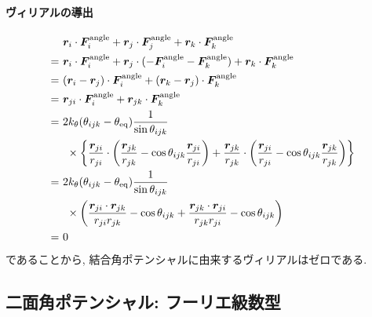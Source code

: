 \paragraph{ヴィリアルの導出}
\begin{align}
 &~  \bm{r}_{i} \cdot \bm{F}_{i}^{\mathrm{angle}}
   + \bm{r}_{j} \cdot \bm{F}_{j}^{\mathrm{angle}}
   + \bm{r}_{k} \cdot \bm{F}_{k}^{\mathrm{angle}}
 \notag \\
 =&~
     \bm{r}_{i} \cdot \bm{F}_{i}^{\mathrm{angle}}
   + \bm{r}_{j} \cdot (-\bm{F}_{i}^{\mathrm{angle}} -\bm{F}_{k}^{\mathrm{angle}})
   + \bm{r}_{k} \cdot \bm{F}_{k}^{\mathrm{angle}}
 \notag \\
 =&~
     (\bm{r}_{i} - \bm{r}_{j}) \cdot \bm{F}_{i}^{\mathrm{angle}}
   + (\bm{r}_{k} - \bm{r}_{j}) \cdot \bm{F}_{k}^{\mathrm{angle}}
 \notag \\
 =&~
     \bm{r}_{ji} \cdot \bm{F}_{i}^{\mathrm{angle}}
   + \bm{r}_{jk} \cdot \bm{F}_{k}^{\mathrm{angle}}
 \notag \\
 =&~
   2k_{\theta} (\theta_{ijk} - \theta_{\mathrm{eq}}) \frac{1}{\sin \theta_{ijk}}
 \notag \\
 &~~\times
   \left\{
           \frac{\bm{r}_{ji}}{r_{ji}} \cdot 
           \left(
                  \frac{\bm{r}_{jk}}{r_{jk}} - \cos\theta_{ijk} \frac{\bm{r}_{ji}}{r_{ji}}
           \right)
          +\frac{\bm{r}_{jk}}{r_{jk}} \cdot 
           \left(
                 \frac{\bm{r}_{ji}}{r_{ji}} - \cos\theta_{ijk} \frac{\bm{r}_{jk}}{r_{jk}}
           \right)
  \right\}
 \notag \\
 =&~
   2k_{\theta} (\theta_{ijk} - \theta_{\mathrm{eq}}) \frac{1}{\sin \theta_{ijk}}
 \notag \\
 &~~\times
   \left(
          \frac{\bm{r}_{ji} \cdot \bm{r}_{jk}}{r_{ji} r_{jk}} - \cos \theta_{ijk}
         +\frac{\bm{r}_{jk} \cdot \bm{r}_{ji}}{r_{jk} r_{ji}} - \cos \theta_{ijk}
   \right)
 \notag \\
 =&~
   0
 \notag 
\end{align}
であることから, 結合角ポテンシャルに由来するヴィリアルはゼロである. 
\clearpage

\subsection{二面角ポテンシャル: フーリエ級数型}
